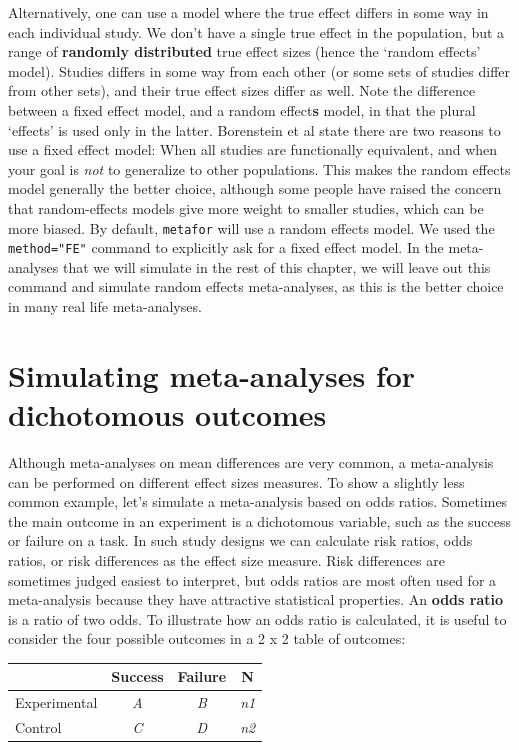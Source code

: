 \documentclass[
  oneside]{krantz}
\begin{document}
Alternatively, one can use a model where the true effect differs in some way in each individual study. We don't have a single true effect in the population, but a range of \textbf{randomly distributed} true effect sizes (hence the `random effects' model). Studies differs in some way from each other (or some sets of studies differ from other sets), and their true effect sizes differ as well. Note the difference between a fixed effect model, and a random effect\textbf{s} model, in that the plural `effects' is used only in the latter. Borenstein et al \citeyearpar{borenstein_introduction_2009} state there are two reasons to use a fixed effect model: When all studies are functionally equivalent, and when your goal is \emph{not} to generalize to other populations. This makes the random effects model generally the better choice, although some people have raised the concern that random-effects models give more weight to smaller studies, which can be more biased. By default, \texttt{metafor} will use a random effects model. We used the \texttt{method="FE"} command to explicitly ask for a fixed effect model. In the meta-analyses that we will simulate in the rest of this chapter, we will leave out this command and simulate random effects meta-analyses, as this is the better choice in many real life meta-analyses.

\hypertarget{simulating-meta-analyses-for-dichotomous-outcomes}{%
\section{Simulating meta-analyses for dichotomous outcomes}\label{simulating-meta-analyses-for-dichotomous-outcomes}}

Although meta-analyses on mean differences are very common, a meta-analysis can be performed on different effect sizes measures. To show a slightly less common example, let's simulate a meta-analysis based on odds ratios. Sometimes the main outcome in an experiment is a dichotomous variable, such as the success or failure on a task. In such study designs we can calculate risk ratios, odds ratios, or risk differences as the effect size measure. Risk differences are sometimes judged easiest to interpret, but odds ratios are most often used for a meta-analysis because they have attractive statistical properties. An \textbf{odds ratio} is a ratio of two odds. To illustrate how an odds ratio is calculated, it is useful to consider the four possible outcomes in a 2 x 2 table of outcomes:

\begin{longtable}[]{@{}lccc@{}}
\toprule()
& Success & Failure & N \\
\midrule()
\endhead
Experimental & \emph{A} & \emph{B} & \emph{n1} \\
Control & \emph{C} & \emph{D} & \emph{n2} \\
\bottomrule()
\end{longtable}
\end{document}
